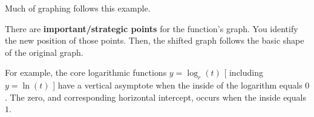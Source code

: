 \documentclass{ximera}
\begin{document}
\begin{example}
\begin{image}
\end{image}








\end{example}


Much of graphing follows this example.  


There are \textbf{important/strategic points} for the function's graph. You identify the new position of those points.  Then, the shifted graph follows the basic shape of the original graph.






For example, the core logarithmic functions $y = \log_r(t)$ [ including $y = \ln(t)$ ] have a vertical asymptote when the inside of the logarithm equals $0$. The zero, and corresponding horizontal intercept, occurs when the inside equals $1$.  
\end{document}
